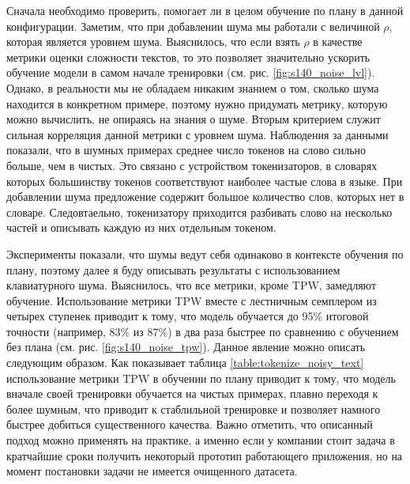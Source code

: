 \documentclass{spbau-diploma}
\begin{document}
Сначала необходимо проверить, помогает ли в целом обучение по плану в данной конфигурации. Заметим, что при добавлении шума мы работали с величиной $\rho$, которая является уровнем шума. Выяснилось, что если взять $\rho$ в качестве метрики оценки сложности текстов, то это позволяет значительно ускорить обучение модели в самом начале тренировки (см. рис. \ref{fig:s140_noise_lvl}). Однако, в реальности мы не обладаем никаким знанием о том, сколько шума находится в конкретном примере, поэтому нужно придумать метрику, которую можно вычислить, не опираясь на знания о шуме. Вторым критерием служит сильная корреляция данной метрики с уровнем шума. Наблюдения за данными показали, что в шумных примерах среднее число токенов на слово сильно больше, чем в чистых. Это связано с устройством токенизаторов, в словарях которых большинству токенов соответствуют наиболее частые слова в языке. При добавлении шума предложение содержит большое количество слов, которых нет в словаре. Следовтаельно, токенизатору приходится разбивать слово на несколько частей и описывать каждую из них отдельным токеном.
	
Эксперименты показали, что шумы ведут себя одинаково в контексте обучения по плану, поэтому далее я буду описывать результаты с использованием клавиатурного шума. Выяснилось, что все метрики, кроме TPW, замедляют обучение. Использование метрики TPW вместе с лестничным семплером из четырех ступенек приводит к тому, что модель обучается до 95\% итоговой точности (например, 83\% из 87\%) в два раза быстрее по сравнению с обучением без плана (см. рис. \ref{fig:s140_noise_tpw}). Данное явление можно описать следующим образом. Как показывает таблица \ref{table:tokenize_noisy_text} использование метрики TPW в обучении по плану приводит к тому, что модель вначале своей тренировки обучается на чистых примерах, плавно переходя к более шумным, что приводит к стаблильной тренировке и позволяет намного быстрее добиться существенного качества. Важно отметить, что описанный подход можно применять на практике, а именно если у компании стоит задача в кратчайшие сроки получить некоторый прототип работающего приложения, но на момент постановки задачи не имеется очищенного датасета.
\end{document}

